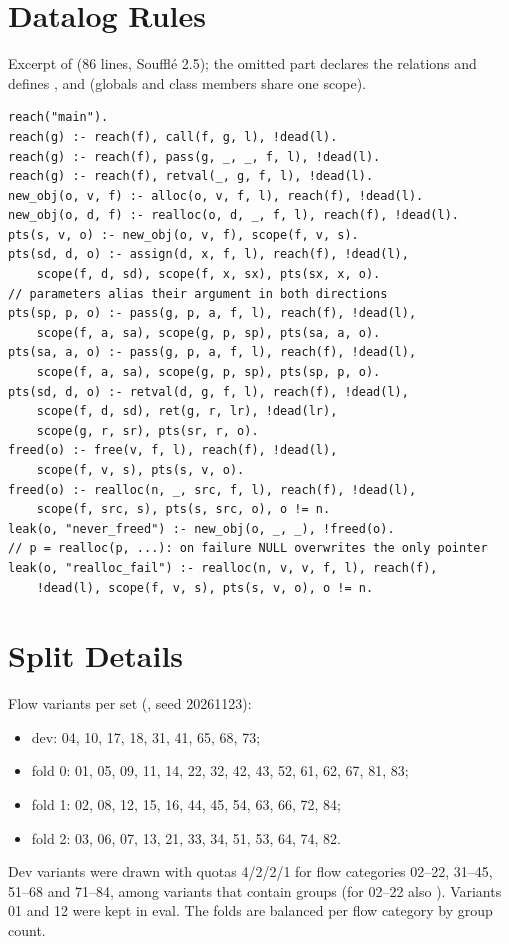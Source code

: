 \section{Datalog Rules}
\label{app:datalog}
Excerpt of  (86 lines, Souffl\'e 2.5); the omitted part declares the relations and defines ,  and  (globals and class members share one scope).
\begin{lstlisting}[basicstyle=\ttfamily\scriptsize,breaklines=true,columns=fullflexible,frame=single]
reach("main").
reach(g) :- reach(f), call(f, g, l), !dead(l).
reach(g) :- reach(f), pass(g, _, _, f, l), !dead(l).
reach(g) :- reach(f), retval(_, g, f, l), !dead(l).
new_obj(o, v, f) :- alloc(o, v, f, l), reach(f), !dead(l).
new_obj(o, d, f) :- realloc(o, d, _, f, l), reach(f), !dead(l).
pts(s, v, o) :- new_obj(o, v, f), scope(f, v, s).
pts(sd, d, o) :- assign(d, x, f, l), reach(f), !dead(l),
    scope(f, d, sd), scope(f, x, sx), pts(sx, x, o).
// parameters alias their argument in both directions
pts(sp, p, o) :- pass(g, p, a, f, l), reach(f), !dead(l),
    scope(f, a, sa), scope(g, p, sp), pts(sa, a, o).
pts(sa, a, o) :- pass(g, p, a, f, l), reach(f), !dead(l),
    scope(f, a, sa), scope(g, p, sp), pts(sp, p, o).
pts(sd, d, o) :- retval(d, g, f, l), reach(f), !dead(l),
    scope(f, d, sd), ret(g, r, lr), !dead(lr),
    scope(g, r, sr), pts(sr, r, o).
freed(o) :- free(v, f, l), reach(f), !dead(l),
    scope(f, v, s), pts(s, v, o).
freed(o) :- realloc(n, _, src, f, l), reach(f), !dead(l),
    scope(f, src, s), pts(s, src, o), o != n.
leak(o, "never_freed") :- new_obj(o, _, _), !freed(o).
// p = realloc(p, ...): on failure NULL overwrites the only pointer
leak(o, "realloc_fail") :- realloc(n, v, v, f, l), reach(f),
    !dead(l), scope(f, v, s), pts(s, v, o), o != n.
\end{lstlisting}

\section{Split Details}
\label{app:split}
Flow variants per set (, seed 20261123):
\begin{itemize}
\item dev: 04, 10, 17, 18, 31, 41, 65, 68, 73;
\item fold 0: 01, 05, 09, 11, 14, 22, 32, 42, 43, 52, 61, 62, 67, 81, 83;
\item fold 1: 02, 08, 12, 15, 16, 44, 45, 54, 63, 66, 72, 84;
\item fold 2: 03, 06, 07, 13, 21, 33, 34, 51, 53, 64, 74, 82.
\end{itemize}
Dev variants were drawn with quotas 4/2/2/1 for flow categories 02--22, 31--45, 51--68 and 71--84, among variants that contain  groups (for 02--22 also ).
Variants 01 and 12 were kept in eval.
The folds are balanced per flow category by group count.
